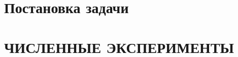 \documentclass[12pt]{article}
\begin{document}
    \section{Постановка задачи}\label{sec:постановка-задачи}
    


    \section{ЧИСЛЕННЫЕ ЭКСПЕРИМЕНТЫ}\label{sec:численные-эксперименты}
    
\end{document}
